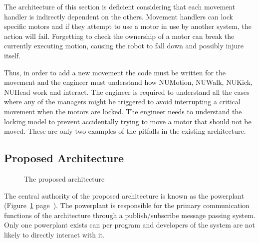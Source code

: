 \documentclass[english,12pt]{scrartcl}
\begin{document}
			The architecture of this section is deficient considering that each movement handler is indirectly dependent on the others.
			Movement handlers can lock specific motors and if they attempt to use a motor in use by another system, the action will fail.
			Forgetting to check the ownership of a motor can break the currently executing motion, causing the robot to fall down and possibly injure itself.

			Thus, in order to add a new movement the code must be written for the movement and the engineer must understand how NUMotion, NUWalk, NUKick, NUHead work and interact.
			The engineer is required to understand all the cases where any of the managers might be triggered to avoid interrupting a critical movement when the motors are locked.
			The engineer needs to understand the locking model to prevent accidentally trying to move a motor that should not be moved. These are only two examples of the pitfalls in the existing architecture.
			
		\subsection{Proposed Architecture}
			\begin{figure}[h]
				\centering
				\caption {The proposed architecture}
				\label{fig:HighLevelProposedArchitecture}
			\end{figure}

			The central authority of the proposed architecture is known as the \gls{powerplant} (Figure~\ref{fig:HighLevelProposedArchitecture} page~\pageref{fig:HighLevelProposedArchitecture}).
			The \gls{powerplant} is responsible for the primary communication functions of the architecture through a publish/subscribe message passing system.
			Only one \gls{powerplant} exists can per program and developers of the system are not likely to directly interact with it.
\end{document}
